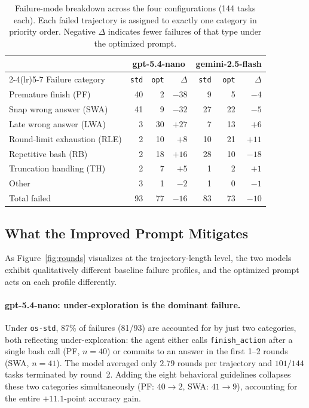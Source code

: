 \documentclass[11pt]{article}
\begin{document}
\begin{table}[t]
\centering
\small
\begin{tabular}{l@{\hskip 12pt}rrr@{\hskip 18pt}rrr}
\toprule
& \multicolumn{3}{c}{\textbf{gpt-5.4-nano}} & \multicolumn{3}{c}{\textbf{gemini-2.5-flash}} \\
\cmidrule(lr){2-4}\cmidrule(lr){5-7}
Failure category & \texttt{std} & \texttt{opt} & $\Delta$ & \texttt{std} & \texttt{opt} & $\Delta$ \\
\midrule
Premature finish (PF)         & 40 & 2  & $-38$ & 9  & 5  & $-4$  \\
Snap wrong answer (SWA)        & 41 & 9  & $-32$ & 27 & 22 & $-5$  \\
Late wrong answer (LWA)        & 3  & 30 & $+27$ & 7  & 13 & $+6$  \\
Round-limit exhaustion (RLE)   & 2  & 10 & $+8$  & 10 & 21 & $+11$ \\
Repetitive bash (RB)           & 2  & 18 & $+16$ & 28 & 10 & $-18$ \\
Truncation handling (TH)       & 2  & 7  & $+5$  & 1  & 2  & $+1$  \\
Other                          & 3  & 1  & $-2$  & 1  & 0  & $-1$  \\
\midrule
Total failed                   & 93 & 77 & $-16$ & 83 & 73 & $-10$ \\
\bottomrule
\end{tabular}
\caption{Failure-mode breakdown across the four configurations (144 tasks each). Each failed trajectory is assigned to exactly one category in priority order. Negative $\Delta$ indicates fewer failures of that type under the optimized prompt.}
\label{tab:failure_modes}
\end{table}

\subsection{What the Improved Prompt Mitigates}

As Figure~\ref{fig:rounds} visualizes at the trajectory-length level, the two models exhibit qualitatively different baseline failure profiles, and the optimized prompt acts on each profile differently.

\paragraph{gpt-5.4-nano: under-exploration is the dominant failure.}
Under \texttt{os-std}, $87\%$ of failures (81/93) are accounted for by just two categories, both reflecting under-exploration: the agent either calls \texttt{finish\_action} after a single bash call (PF, $n{=}40$) or commits to an answer in the first 1--2 rounds (SWA, $n{=}41$). The model averaged only $2.79$ rounds per trajectory and $101/144$ tasks terminated by round~2. Adding the eight behavioral guidelines collapses these two categories simultaneously (PF: $40\to 2$, SWA: $41\to 9$), accounting for the entire $+11.1$-point accuracy gain.
\end{document}
